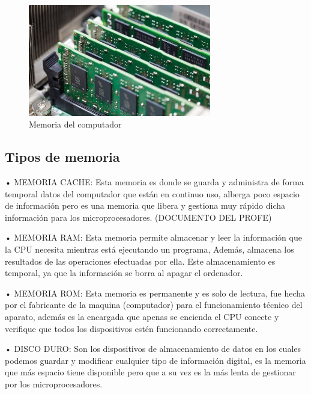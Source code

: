 \documentclass{article}
\begin{document}
\begin{figure}[h]
\includegraphics[width=8cm]{que es la memoria.png}
\centering
\caption{Memoria del computador}
\label{fig:que es la memoria}
\end{figure}

\vspace{8cm}

\subsection{Tipos de memoria}
•	MEMORIA CACHE: Esta memoria es donde se guarda y administra de forma temporal datos  del computador que están en continuo uso, alberga poco espacio de información pero es una memoria que libera y gestiona muy rápido dicha información para los microprocesadores. (DOCUMENTO DEL PROFE)

 \vspace{1cm}
 
•	MEMORIA RAM: Esta memoria permite almacenar y leer la información que la CPU necesita mientras está ejecutando un programa, Además, almacena los resultados de las operaciones efectuadas por ella. Este almacenamiento es temporal, ya que la información se borra al apagar el ordenador. \cite{memoria}

 \vspace{1cm}
 
•	MEMORIA ROM: Esta memoria es permanente y es solo de lectura, fue hecha por el fabricante de la maquina (computador) para el funcionamiento técnico del aparato, además es la encargada que apenas se encienda el CPU conecte y verifique que todos los dispositivos estén funcionando correctamente.

 \vspace{1cm}
 
•	DISCO DURO: Son los dispositivos de almacenamiento de datos en los cuales podemos guardar y modificar cualquier tipo de información digital, es la memoria que más espacio tiene disponible pero que a su vez es la más lenta de gestionar por los microprocesadores. \cite{rom}
\end{document}

